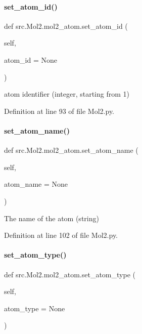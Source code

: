 \paragraph{\texorpdfstring{set\+\_\+atom\+\_\+id()}{set\_atom\_id()}}
{\footnotesize\ttfamily def src.\+Mol2.\+mol2\+\_\+atom.\+set\+\_\+atom\+\_\+id (\begin{DoxyParamCaption}\item[{}]{self,  }\item[{}]{atom\+\_\+id = {\ttfamily None} }\end{DoxyParamCaption})}



atom identifier (integer, starting from 1) 



Definition at line 93 of file Mol2.\+py.

\mbox{\label{classsrc_1_1Mol2_1_1mol2__atom_a54d21f9992f0b3344129d7dc5b767fac}} 
\paragraph{\texorpdfstring{set\+\_\+atom\+\_\+name()}{set\_atom\_name()}}
{\footnotesize\ttfamily def src.\+Mol2.\+mol2\+\_\+atom.\+set\+\_\+atom\+\_\+name (\begin{DoxyParamCaption}\item[{}]{self,  }\item[{}]{atom\+\_\+name = {\ttfamily None} }\end{DoxyParamCaption})}



The name of the atom (string) 



Definition at line 102 of file Mol2.\+py.

\mbox{\label{classsrc_1_1Mol2_1_1mol2__atom_a57b9746cd3505288885f5595a16f24d3}} 
\paragraph{\texorpdfstring{set\+\_\+atom\+\_\+type()}{set\_atom\_type()}}
{\footnotesize\ttfamily def src.\+Mol2.\+mol2\+\_\+atom.\+set\+\_\+atom\+\_\+type (\begin{DoxyParamCaption}\item[{}]{self,  }\item[{}]{atom\+\_\+type = {\ttfamily None} }\end{DoxyParamCaption})}



